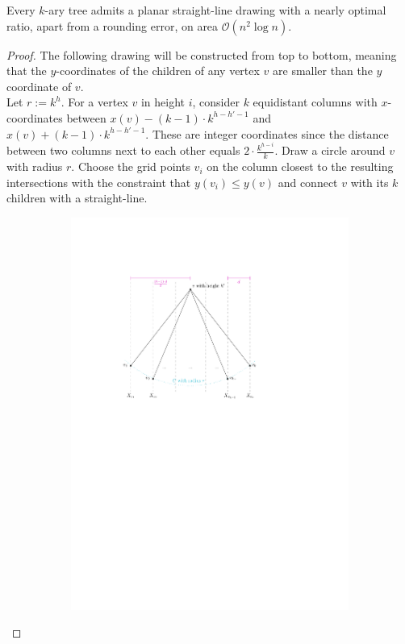 \begin{theorem}
	Every $k$-ary tree admits a planar straight-line drawing with a nearly optimal ratio, apart from a rounding error, on area $\mathcal{O}(n^2\log n)$.
\end{theorem}
\begin{proof}
	The following drawing will be constructed from top to bottom, meaning that the $y$-coordinates of the children of any vertex $v$ are smaller than the $y$ coordinate of $v$.\\
	Let $r := k^h$. For a vertex $v$ in height $i$, consider $k$ equidistant columns with $x$-coordinates between $x(v) - (k-1)\cdot  k^{h-h'-1}$ and $x(v) + (k-1)\cdot  k^{h-h'-1}$. These are integer coordinates since the distance between two columns next to each other equals $2\cdot \frac{k^{h-i}}{k}$. Draw a circle around $v$ with radius $r$. Choose the grid points $v_i$ on the column closest to the resulting intersections with the constraint that $y(v_i) \leq y(v)$ and connect $v$ with its $k$ children with a straight-line.
\begin{figure}[H]
	\centering
		\begin{subfigure}{\textwidth}
			\centering
			\includegraphics[page=1,width=0.8\linewidth]{graphics/k-ary_tree_algorithm_construction.pdf}

\end{subfigure}
\end{figure}
\end{proof}
